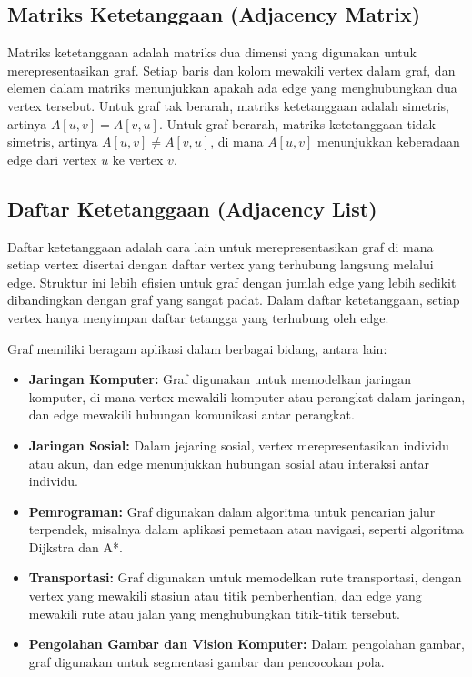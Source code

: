 \subsection{Matriks Ketetanggaan (Adjacency Matrix)}
Matriks ketetanggaan adalah matriks dua dimensi yang digunakan untuk merepresentasikan graf. Setiap baris dan kolom mewakili vertex dalam graf, dan elemen dalam matriks menunjukkan apakah ada edge yang menghubungkan dua vertex tersebut. Untuk graf tak berarah, matriks ketetanggaan adalah simetris, artinya \( A[u, v] = A[v, u] \). Untuk graf berarah, matriks ketetanggaan tidak simetris, artinya \( A[u, v] \neq A[v, u] \), di mana \( A[u, v] \) menunjukkan keberadaan edge dari vertex \( u \) ke vertex \( v \).

\subsection{Daftar Ketetanggaan (Adjacency List)}
Daftar ketetanggaan adalah cara lain untuk merepresentasikan graf di mana setiap vertex disertai dengan daftar vertex yang terhubung langsung melalui edge. Struktur ini lebih efisien untuk graf dengan jumlah edge yang lebih sedikit dibandingkan dengan graf yang sangat padat. Dalam daftar ketetanggaan, setiap vertex hanya menyimpan daftar tetangga yang terhubung oleh edge.


Graf memiliki beragam aplikasi dalam berbagai bidang, antara lain:

\begin{itemize}
    \item \textbf{Jaringan Komputer:} Graf digunakan untuk memodelkan jaringan komputer, di mana vertex mewakili komputer atau perangkat dalam jaringan, dan edge mewakili hubungan komunikasi antar perangkat.
    \item \textbf{Jaringan Sosial:} Dalam jejaring sosial, vertex merepresentasikan individu atau akun, dan edge menunjukkan hubungan sosial atau interaksi antar individu.
    \item \textbf{Pemrograman:} Graf digunakan dalam algoritma untuk pencarian jalur terpendek, misalnya dalam aplikasi pemetaan atau navigasi, seperti algoritma Dijkstra dan A*.
    \item \textbf{Transportasi:} Graf digunakan untuk memodelkan rute transportasi, dengan vertex yang mewakili stasiun atau titik pemberhentian, dan edge yang mewakili rute atau jalan yang menghubungkan titik-titik tersebut.
    \item \textbf{Pengolahan Gambar dan Vision Komputer:} Dalam pengolahan gambar, graf digunakan untuk segmentasi gambar dan pencocokan pola.
\end{itemize}

